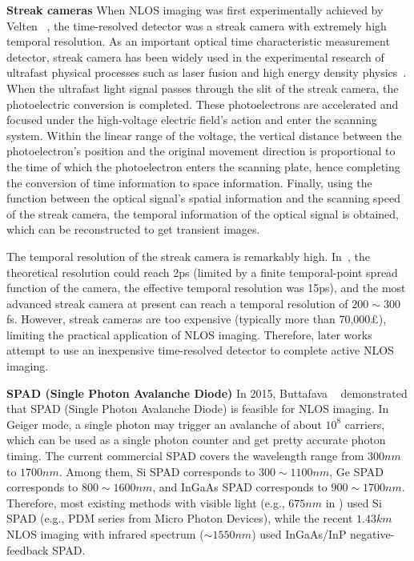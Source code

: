\vspace{0.8mm}
\noindent \textbf{Streak cameras}
When NLOS imaging was first experimentally achieved by Velten \etal~\cite{veltenRecoveringThreedimensionalShape2012}, the time-resolved detector was a streak camera with extremely high temporal resolution. As an important optical time characteristic measurement detector, streak camera has been widely used in the experimental research of ultrafast physical processes such as laser fusion and high energy density physics~\cite{shiraga_ultrafast_1997}. 
When the ultrafast light signal passes through the slit of the streak camera, the photoelectric conversion is completed. These photoelectrons are accelerated and focused under the high-voltage electric field's action and enter the scanning system. Within the linear range of the voltage, the vertical distance between the photoelectron's position and the original movement direction is proportional to the time of which the photoelectron enters the scanning plate, hence completing the conversion of time information to space information. Finally, using the function between the optical signal's spatial information and the scanning speed of the streak camera, the temporal information of the optical signal is obtained, which can be reconstructed to get transient images.

The temporal resolution of the streak camera is remarkably high. In~\cite{veltenRecoveringThreedimensionalShape2012}, the theoretical resolution could reach 2ps (limited by a finite temporal-point spread function of the camera, the effective temporal resolution was 15ps), and the most advanced streak camera at present can reach a temporal resolution of $200\sim 300$ fs. However, streak cameras are too expensive (typically more than 70,000\pounds), limiting the practical application of NLOS imaging. Therefore, later works attempt to use an inexpensive time-resolved detector to complete active NLOS imaging.

\vspace{0.8mm}
\noindent \textbf{SPAD (Single Photon Avalanche Diode)}
In 2015, Buttafava \etal~\cite{buttafavaNonlineofsightImagingUsing2015} demonstrated that SPAD (Single Photon Avalanche Diode) is feasible for NLOS imaging.
In Geiger mode, a single photon may trigger an avalanche of about $10^8$ carriers, which can be used as a single photon counter and get pretty accurate photon timing.
The current commercial SPAD covers the wavelength range from $300 nm$ to $1700 nm$. Among them, Si SPAD corresponds to $300\sim 1100 nm$, Ge SPAD corresponds to $800\sim 1600 nm$, and InGaAs SPAD corresponds to $900\sim 1700 nm$\cite{zhou_research_2010}. Therefore, most existing methods with visible light (e.g., $675nm$ in \cite{otooleConfocalNonlineofsightImaging2018}) used Si SPAD (e.g., PDM series from Micro Photon Devices), while the recent $1.43 km$ NLOS imaging \cite{wuNonLineofsightImaging2021} with infrared spectrum ($\sim 1550nm$) used InGaAs/InP negative-feedback SPAD.


